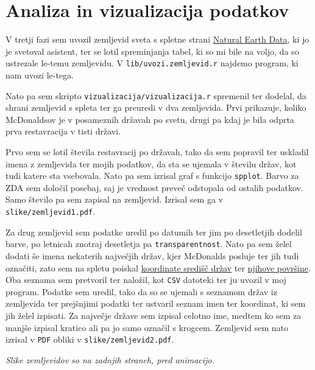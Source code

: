 \documentclass[11pt,a4paper]{article}
\begin{document}
\newpage

\section{Analiza in vizualizacija podatkov}


V tretji fazi sem uvozil zemljevid sveta s spletne strani \href{http://www.naturalearthdata.com/http//www.naturalearthdata.com/download/50m/cultural/ne_50m_admin_0_countries.zip}{Natural Earth Data}, ki jo je svetoval asistent, ter se lotil spreminjanja tabel, ki so mi bile na voljo, da so ustrezale le-temu zemljevidu. V \verb|lib/uvozi.zemljevid.r| najdemo program, ki nam uvozi le-tega. \par

Nato pa sem skripto \verb|vizualizacija/vizualizacija.r| spremenil ter dodelal, da shrani zemljevid s spleta ter ga preuredi v dva zemljevida. Prvi prikazuje, koliko McDonaldsov je v posameznih državah po svetu, drugi pa kdaj je bila odprta prva restavracija v tisti državi. \par
\vspace{1em}
\noindent
Prvo sem se lotil števila restavracij po državah, tako da sem popravil ter uskladil imena z zemljevida ter mojih podatkov, da sta se ujemala v številu držav, kot tudi katere sta vsebovala. Nato pa sem izrisal graf s funkcijo \verb|spplot|. Barvo za ZDA sem določil posebaj, saj je vrednost preveč odstopala od ostalih podatkov. Samo število pa sem zapisal na zemljevid. Izrisal sem ga v \verb|slike/zemljevid1.pdf|. \par
\vspace{1em}
\noindent
Za drug zemljevid sem podatke uredil po datumih ter jim po desetletjih dodelil barve, po letnicah znotraj desetletja pa \verb|transparentnost|. Nato pa sem želel dodati še imena nekaterih največjih držav, kjer McDonalds posluje ter jih tudi označiti, zato sem na spletu poiskal \href{https://developers.google.com/public-data/docs/canonical/countries_csv}{koordinate središč držav} ter \href{http://simple.wikipedia.org/wiki/List_of_countries_by_area}{njihove površine}. Oba seznama sem pretvoril ter naložil, kot \verb|CSV| datoteki ter ju uvozil v moj program. Podatke sem uredil, tako da so se ujemali s seznamom držav iz zemljevida ter prejšnjimi podatki ter ustvaril seznam imen ter koordinat, ki sem jih želel izpisati. Za največje države sem izpisal celotno ime, medtem ko sem za manjše izpisal kratico ali pa jo samo označil s krogcem. Zemljevid sem nato izrisal v \verb|PDF| obliki v \verb|slike/zemljevid2.pdf|. \par
\vspace{1em}
\noindent
\textit{Slike zemljevidov so na zadnjih straneh, pred animacijo.}
 
\end{document}
